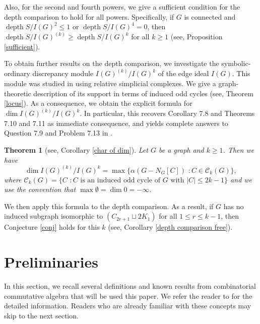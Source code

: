 \documentclass[12pt]{amsart}
\newtheorem{thm}{Theorem}[section]
\theoremstyle{definition}
\theoremstyle{remark}
\DeclareMathOperator{\depth}{depth}
\begin{document}
Also, for the second and fourth powers, we give a sufficient condition for the depth comparison to hold for all powers. Specifically, if $G$ is connected and $\depth S/I(G)^{2}\leq1$ or $\depth S/I(G)^{4}=0$, then $\depth S/I(G)^{(k)}\geq\depth S/I(G)^{k}$ for all $k\geq1$ (see, Proposition \ref{sufficient}). 

To obtain further results on the depth comparison, we investigate the symbolic-ordinary discrepancy module $I(G)^{(k)}/I(G)^{k}$ of the edge ideal $I(G)$. This module was studied in \cite{hm2026} using relative simplicial complexes. We give a graph-theoretic description of its support in terms of induced odd cycles (see, Theorem \ref{locus}). As a consequence, we obtain the explicit formula for $\dim I(G)^{(k)}/I(G)^{k}$. In particular, this recovers Corollary 7.8 and Theorems 7.10 and 7.11 as immediate consequence, and yields complete answers to Question 7.9 and Problem 7.13 in \cite{hm2026}. 

\begin{thm}[see, Corollary \ref{char of dim}]
Let $G$ be a graph and $k\geq1$. Then we have 
$$\dim I(G)^{(k)}/I(G)^{k}=\max\{\alpha(G-N_{G}[C])\,\,: C\in\mathcal{C}_{k}(G)\},$$
where $\mathcal{C}_{k}(G)=\{C\,\,: C\mbox{ is an induced odd cycle of }G\mbox{ with }|C|\leq 2k-1\}$ and we use the convention that $\max\emptyset=\dim 0=-\infty$.
\end{thm}

We then apply this formula to the depth comparison. As a result, if $G$ has no induced subgraph isomorphic to  $(C_{2r+1}\sqcup2K_{1})$ for all $1\leq r\leq k-1$, then Conjecture \ref{conj} holds for this $k$ (see, Corollary \ref{depth comparison free}).  


\section{Preliminaries}

In this section, we recall several definitions and known results from combinatorial commutative algebra that will be used this paper. We refer the reader to \cite{BHBook, HHBook, VBook} for the detailed information. Readers who are already familiar with these concepts may skip to the next section. 
\end{document}
